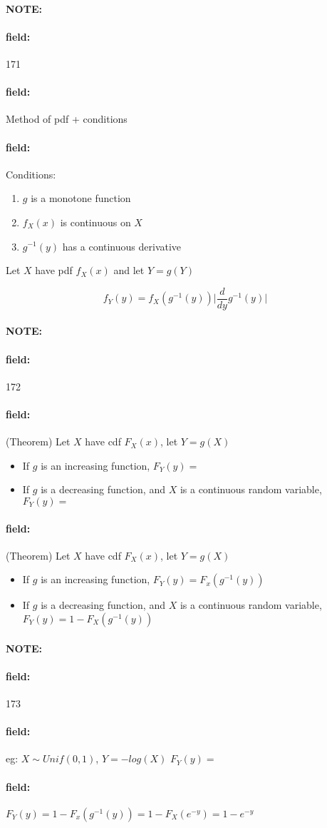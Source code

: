 \documentclass[12pt]{article}
\newenvironment{note}{\paragraph{NOTE:}}{}
\newenvironment{field}{\paragraph{field:}}{}
\begin{document}
\begin{note} \begin{field} \tiny 171 \end{field}
  \begin{field}
    Method of pdf + conditions
  \end{field}
  \begin{field}
    Conditions:
    \begin{enumerate}
      \item $g$ is a monotone function
      \item $f_X(x)$ is continuous on $X$
      \item $g^{-1}(y)$ has a continuous derivative
    \end{enumerate}
    Let $X$ have pdf $f_X(x)$ and let $Y = g(Y)$

    $$f_Y(y) = f_X(g^{-1}(y))\bigg|\frac{d}{dy}g^{-1}(y)\bigg|$$
  \end{field}
\end{note}

\begin{note} \begin{field} \tiny 172 \end{field}
  \begin{field}
    (Theorem) Let $X$ have cdf $F_X(x)$, let $Y = g(X)$
    \begin{itemize}
      \item If $g$ is an increasing function, $F_Y(y) = $
      \item If $g$ is a decreasing function, and $X$ is a continuous random variable, $F_Y(y) = $
    \end{itemize}
  \end{field}
  \begin{field}
    (Theorem) Let $X$ have cdf $F_X(x)$, let $Y = g(X)$
    \begin{itemize}
      \item If $g$ is an increasing function, $F_Y(y) = F_x(g^{-1}(y))$
      \item If $g$ is a decreasing function, and $X$ is a continuous random variable, $F_Y(y) = 1 - F_X(g^{-1}(y))$
    \end{itemize}
  \end{field}
\end{note}

\begin{note} \begin{field} \tiny 173 \end{field}
  \begin{field}
    eg: $X \sim Unif(0,1)$, $Y = -log(X)$
    $F_Y(y) = $
  \end{field}
  \begin{field}
    $F_Y(y) = 1 - F_x(g^{-1}(y)) = 1 - F_X(e^{-y}) = 1 - e^{-y}$
  \end{field}
\end{note}
\end{document}
